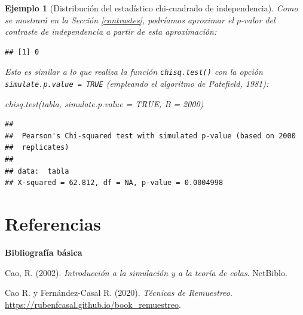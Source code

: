 \documentclass[
]{book}
\newenvironment{Shaded}{\begin{snugshade}}{\end{snugshade}}
\newcommand{\AttributeTok}[1]{\textcolor[rgb]{0.77,0.63,0.00}{#1}}
\newcommand{\ConstantTok}[1]{\textcolor[rgb]{0.00,0.00,0.00}{#1}}
\newcommand{\DecValTok}[1]{\textcolor[rgb]{0.00,0.00,0.81}{#1}}
\newcommand{\FunctionTok}[1]{\textcolor[rgb]{0.00,0.00,0.00}{#1}}
\newcommand{\NormalTok}[1]{#1}
\newcommand{\OtherTok}[1]{\textcolor[rgb]{0.56,0.35,0.01}{#1}}
\newcommand{\SpecialCharTok}[1]{\textcolor[rgb]{0.00,0.00,0.00}{#1}}
\theoremstyle{break}
\newtheorem{example}{Ejemplo}[chapter]
\theoremstyle{nonumberplain}
\begin{document}
\begin{example}[Distribución del estadístico chi-cuadrado de independencia]
Como se mostrará en la Sección \ref{contrastes}, podríamos aproximar el \(p\)-valor del contraste de independencia a partir de esta aproximación:

\begin{Shaded}
\end{Shaded}

\begin{verbatim}
## [1] 0
\end{verbatim}

Esto es similar a lo que realiza la función \texttt{chisq.test()} con la opción \texttt{simulate.p.value\ =\ TRUE} (empleando el algoritmo de Patefield, 1981):

\begin{Shaded}
\begin{Highlighting}[]
\FunctionTok{chisq.test}\NormalTok{(tabla, }\AttributeTok{simulate.p.value =} \ConstantTok{TRUE}\NormalTok{, }\AttributeTok{B =} \DecValTok{2000}\NormalTok{)}
\end{Highlighting}
\end{Shaded}

\begin{verbatim}
## 
##  Pearson's Chi-squared test with simulated p-value (based on 2000
##  replicates)
## 
## data:  tabla
## X-squared = 62.812, df = NA, p-value = 0.0004998
\end{verbatim}

\end{example}

\hypertarget{referencias}{%
\chapter*{Referencias}\label{referencias}}

\textbf{Bibliografía básica}

Cao, R. (2002). \emph{Introducción a la simulación y a la teoría de colas}. NetBiblo.

Cao R. y Fernández-Casal R. (2020). \emph{Técnicas de Remuestreo}. \url{https://rubenfcasal.github.io/book_remuestreo}.
\end{document}
